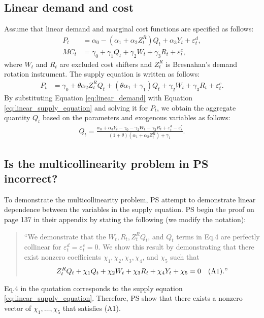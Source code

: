 \documentclass[11pt, a4paper]{article}
\begin{document}
\subsection{Linear demand and cost}
Assume that linear demand and marginal cost functions are specified as follows:
\begin{align}
    P_t &= \alpha_0 - (\alpha_1 + \alpha_2Z^{R}_{t})Q_{t} + \alpha_3 Y_t + \varepsilon^{d}_{t},\label{eq:linear_demand}\\
    MC_t &= \gamma_0  + \gamma_1 Q_{t} + \gamma_2 W_{t} + \gamma_3 R_{t} + \varepsilon^{c}_{t},\label{eq:linear_marginal_cost}
\end{align}
where $W_{t}$ and $R_{t}$ are excluded cost shifters and $Z^{R}_{t}$ is Bresnahan's demand rotation instrument. 
The supply equation is written as follows:
\begin{align}
    P_t 
    &= \gamma_0 + \theta \alpha_2 Z^{R}_tQ_{t} + (\theta\alpha_1 + \gamma_1) Q_{t} + \gamma_2 W_t + \gamma_3 R_{t} +\varepsilon^c_t.\label{eq:linear_supply_equation}
\end{align}
By substituting Equation \eqref{eq:linear_demand} with Equation \eqref{eq:linear_supply_equation} and solving it for $P_t$, we obtain the aggregate quantity $Q_{t}$ based on the parameters and exogenous variables as follows:
\begin{align}
    Q_{t} =  \frac{\alpha_0 + \alpha_3 Y_t - \gamma_0 - \gamma_2 W_{t} - \gamma_3 R_{t} + \varepsilon^{d}_{t} - \varepsilon^{c}_{t}}{(1 + \theta) (\alpha_1 + \alpha_2 Z^{R}_{t}) + \gamma_1}.\label{eq:quantity_linear}
\end{align}







\subsection{Is the multicollinearity problem in PS incorrect?}
To demonstrate the multicollinearity problem, PS attempt to demonstrate linear dependence between the variables in the supply equation. 
PS begin the proof on page 137 in their appendix by stating the following (we modify the notation):
\begin{quote}
    ``We demonstrate that the $W_{t}, R_{t}, Z^{R}_{t}Q_{t}$, and $Q_{t}$ terms in Eq.4 are perfectly collinear for $\varepsilon_{t}^{d} = \varepsilon_{t}^{c} = 0$. We show this result by demonstrating that there exist nonzero coefficients $\chi_1,\chi_2,\chi_3,\chi_4$, and $\chi_5$ such that 
   \begin{align*}
    Z^{R}_{t} Q_{t} + \chi_1 Q_{t} + \chi_2 W_{t} + \chi_3 R_{t} + \chi_4 Y_{t} + \chi_5 = 0 \quad (\text{A1})."
    \end{align*}
\end{quote}
Eq.4 in the quotation corresponds to the supply equation \eqref{eq:linear_supply_equation}.
Therefore, PS show that there exists a nonzero vector of $\chi_1, \ldots, \chi_5$ that satisfies (A1).
\end{document}
